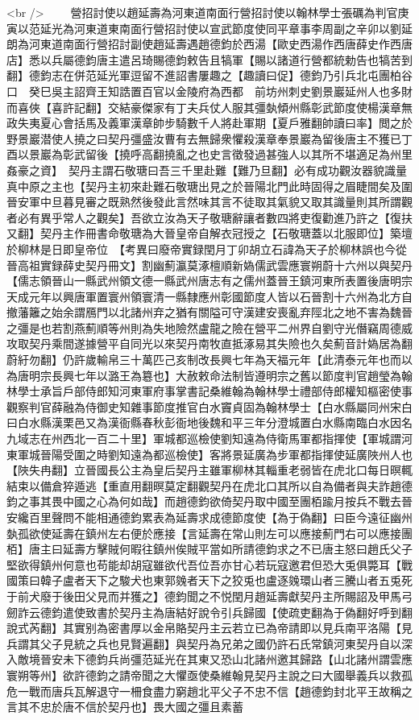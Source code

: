 <br />
　　營招討使以趙延壽為河東道南面行營招討使以翰林學士張礪為判官庚寅以范延光為河東道東南面行營招討使以宣武節度使同平章事李周副之辛卯以劉延朗為河東道南面行營招討副使趙延壽遇趙德鈞於西湯【歐史西湯作西唐薛史作西唐店】悉以兵屬德鈞唐主遣呂琦賜德鈞敕告且犒軍【賜以諸道行營都統勅告也犒苦到翻】德鈞志在併范延光軍逗留不進詔書屢趣之【趣讀曰促】德鈞乃引兵北屯團柏谷口　癸巳吳主詔齊王知誥置百官以金陵府為西都　前坊州刺史劉景巖延州人也多財而喜俠【喜許記翻】交結豪傑家有丁夫兵仗人服其彊埶傾州縣彰武節度使楊漢章無政失夷夏心會括馬及義軍漢章帥步騎數千人將赴軍期【夏戶雅翻帥讀曰率】閲之於野景巖潜使人撓之曰契丹彊盛汝曹有去無歸衆懼殺漢章奉景巖為留後唐主不獲已丁酉以景巖為彰武留後【撓呼高翻撓亂之也史言徵發過甚強人以其所不堪適足為州里姦豪之資】　契丹主謂石敬瑭曰吾三千里赴難【難乃旦翻】必有成功觀汝器貌識量真中原之主也【契丹主初來赴難石敬瑭出見之於晉陽北門此時固得之眉睫間矣及圍晉安軍中旦暮見審之既熟然後發此言然味其言不徒取其氣貌又取其識量則其所謂觀者必有異乎常人之觀矣】吾欲立汝為天子敬瑭辭讓者數四將吏復勸進乃許之【復扶又翻】契丹主作冊書命敬瑭為大晉皇帝自解衣冠授之【石敬瑭蓋以北服即位】築壇於柳林是日即皇帝位　【考異曰廢帝實録閏月丁卯胡立石諱為天子於柳林誤也今從晉高祖實録薛史契丹冊文】割幽薊瀛莫涿檀順新媯儒武雲應寰朔蔚十六州以與契丹【儒志領晉山一縣武州領文德一縣武州唐志有之儒州蓋晉王鎮河東所表置後唐明宗天成元年以興唐軍置寰州領寰清一縣隸應州彰國節度人皆以石晉割十六州為北方自撤藩籬之始余謂鴈門以北諸州弃之猶有關隘可守漢建安喪亂弃陘北之地不害為魏晉之彊是也若割燕薊順等州則為失地險然盧龍之險在營平二州界自劉守光僭竊周德威攻取契丹乘間遂據營平自同光以來契丹南牧直抵涿易其失險也久矣薊音計媯居為翻蔚紆勿翻】仍許歲輸帛三十萬匹己亥制改長興七年為天福元年【此清泰元年也而以為唐明宗長興七年以潞王為簒也】大赦敕命法制皆遵明宗之舊以節度判官趙瑩為翰林學士承旨戶部侍郎知河東軍府事掌書記桑維翰為翰林學士禮部侍郎權知樞密使事觀察判官薛融為侍御史知雜事節度推官白水竇貞固為翰林學士【白水縣屬同州宋白曰白水縣漢栗邑又為漢衙縣春秋彭衙地後魏和平三年分澄城置白水縣南臨白水因名九域志在州西北一百二十里】軍城都巡檢使劉知遠為侍衛馬軍都指揮使【軍城謂河東軍城晉陽受圍之時劉知遠為都巡檢使】客將景延廣為步軍都指揮使延廣陜州人也【陜失冉翻】立晉國長公主為皇后契丹主雖軍柳林其輜重老弱皆在虎北口每日暝輒結束以備倉猝遁逃【重直用翻暝莫定翻觀契丹在虎北口其所以自為備者與夫詐趙德鈞之事其畏中國之心為何如哉】而趙德鈞欲倚契丹取中國至團栢踰月按兵不戰去晉安纔百里聲問不能相通德鈞累表為延壽求成德節度使【為于偽翻】曰臣今遠征幽州埶孤欲使延壽在鎮州左右便於應接【言延壽在常山則左可以應接薊門右可以應接團栢】唐主曰延壽方擊賊何暇往鎮州俟賊平當如所請德鈞求之不已唐主怒曰趙氏父子堅欲得鎮州何意也苟能却胡寇雖欲代吾位吾亦甘心若玩寇邀君但恐大兎俱斃耳【戰國策曰韓子盧者天下之駿犬也東郭㕙者天下之狡兎也盧逐㕙環山者三騰山者五兎死于前犬廢于後田父見而并獲之】德鈞聞之不悦閏月趙延壽獻契丹主所賜詔及甲馬弓劒詐云德鈞遣使致書於契丹主為唐結好說令引兵歸國【使疏吏翻為于偽翻好呼到翻說式芮翻】其實别為密書厚以金帛賂契丹主云若立已為帝請即以見兵南平洛陽【見兵謂其父子見統之兵也見賢遍翻】與契丹為兄弟之國仍許石氏常鎮河東契丹自以深入敵境晉安未下德鈞兵尚彊范延光在其東又恐山北諸州邀其歸路【山北諸州謂雲應寰朔等州】欲許德鈞之請帝聞之大懼亟使桑維翰見契丹主說之曰大國舉義兵以救孤危一戰而唐兵瓦解退守一柵食盡力窮趙北平父子不忠不信【趙德鈞封北平王故稱之言其不忠於唐不信於契丹也】畏大國之彊且素蓄